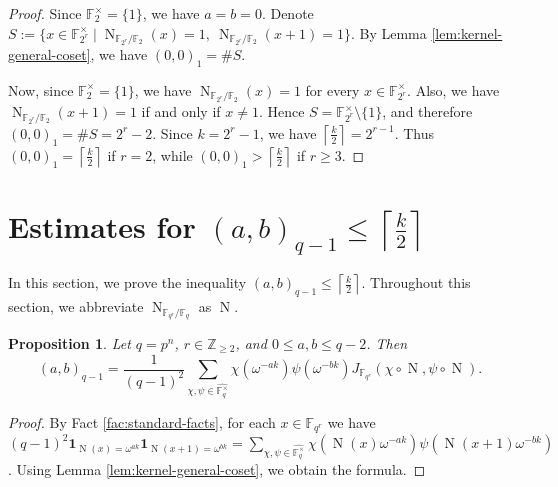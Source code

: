 \documentclass[10pt,a4paper]{article}
\newtheorem{prop}[thm]{Proposition}
\newcommand{\Norm}{\operatorname{N}}
\newcommand{\one}{\mathbf{1}}
\numberwithin{equation}{section}
\begin{document}
\begin{proof}
Since $\mathbb{F}_2^\times=\{1\}$, we have $a=b=0$. Denote $S:=\{x\in \mathbb{F}_{2^r}^\times\mid \Norm_{\mathbb{F}_{2^r}/\mathbb{F}_2}(x)=1,\ \Norm_{\mathbb{F}_{2^r}/\mathbb{F}_2}(x+1)=1\}$. By Lemma \ref{lem:kernel-general-coset}, we have $(0,0)_1=\#S$.

Now, since $\mathbb{F}_2^\times=\{1\}$, we have $\Norm_{\mathbb{F}_{2^r}/\mathbb{F}_2}(x)=1$ for every $x\in \mathbb{F}_{2^r}^\times$. Also, we have $\Norm_{\mathbb{F}_{2^r}/\mathbb{F}_2}(x+1)=1$ if and only if $x\neq 1$. Hence $S=\mathbb{F}_{2^r}^\times\setminus\{1\}$, and therefore $(0,0)_1=\#S=2^r-2$.
Since $k=2^r-1$, we have $\left\lceil \frac{k}{2}\right\rceil=2^{r-1}$. Thus $(0,0)_1=\left\lceil \frac{k}{2}\right\rceil$ if $r=2$, while $(0,0)_1>\left\lceil \frac{k}{2}\right\rceil$ if $r\ge 3$.
\end{proof}




\section{Estimates for $(a,b)_{q-1}\le \left\lceil \frac{k}{2}\right\rceil$}\label{sec:order-qminus1}

In this section, we prove the inequality $(a,b)_{q-1}\le \left\lceil \frac{k}{2}\right\rceil$. Throughout this section, we abbreviate $\Norm_{\mathbb{F}_{q^r}/\mathbb{F}_q}$ as $\Norm$.

\begin{prop}\label{prop:exact-character-formula-general}
Let $q=p^n$, $r\in \mathbb{Z}_{\ge 2}$, and $0\le a,b\le q-2$. Then
\begin{equation}\label{eq:exact-character-formula-general}
(a,b)_{q-1}=\frac{1}{(q-1)^2}
\sum_{\chi,\psi\in \widehat{\mathbb{F}_q^\times}}
\chi(\omega^{-ak})\psi(\omega^{-bk})
J_{\mathbb{F}_{q^r}}(\chi\circ \Norm,\psi\circ \Norm).
\end{equation}
\end{prop}

\begin{proof}
By Fact \ref{fac:standard-facts}, for each $x\in \mathbb{F}_{q^r}$ we have $(q-1)^2\one_{\Norm(x)=\omega^{ak}}\one_{\Norm(x+1)=\omega^{bk}}=\sum_{\chi,\psi\in\widehat{\mathbb{F}_q^\times}}\chi(\Norm(x)\omega^{-ak})\psi(\Norm(x+1)\omega^{-bk})$. Using Lemma \ref{lem:kernel-general-coset}, we obtain the formula.
\end{proof}
\end{document}
